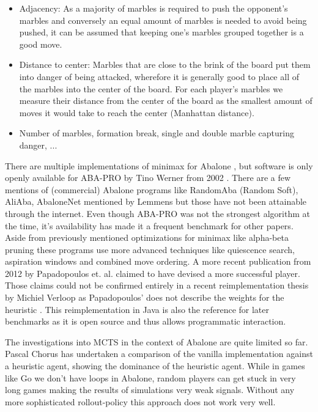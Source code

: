 \begin{itemize}
    \item Adjacency: As a majority of marbles is required to push the opponent's marbles and conversely an equal amount of marbles is needed to avoid being pushed, it can be assumed that keeping one's marbles grouped together is a good move.
    \item Distance to center: Marbles that are close to the brink of the board put them into danger of being attacked, wherefore it is generally good to place all of the marbles into the center of the board. For each player's marbles we measure their distance from the center of the board as the smallest amount of moves it would take to reach the center (Manhattan distance).
    \item Number of marbles, formation break, single and double marble capturing danger, ... \cite[p. 64]{papadopoulos_exploring_2012}
\end{itemize}

There are multiple implementations of minimax for Abalone \cite{chorus_implementing_2009,lemmens_constructing_2005,ozcan_simple_2004-1,aichholzer_algorithmic_2002}, but software is only openly available for ABA-PRO by Tino Werner from 2002 \cite{aichholzer_oswin_2006}. There are a few mentions of (commercial) Abalone programs like RandomAba (Random Soft), AliAba, AbaloneNet mentioned by Lemmens \cite[p. 7]{lemmens_constructing_2005} but those have not been attainable through the internet. Even though ABA-PRO was not the strongest algorithm at the time, it's availability has made it a frequent benchmark for other papers. Aside from previously mentioned optimizations for minimax like alpha-beta pruning these programs use more advanced techniques like quiescence search, aspiration windows and combined move ordering. A more recent publication from 2012 by Papadopoulos et. al. claimed to have devised a more successful player. \cite{papadopoulos_exploring_2012}  Those claims could not be confirmed entirely in a recent reimplementation thesis by Michiel Verloop as Papadopoulos' does not describe the weights for the heuristic \cite{verloop_critical_nodate}. This reimplementation in Java \cite{verloop_abaloneai_nodate} is also the reference for later benchmarks as it is open source \cite{verloop_abaloneai_nodate} and thus allows programmatic interaction.

The investigations into MCTS in the context of Abalone are quite limited so far. Pascal Chorus has undertaken a comparison of the vanilla implementation against a heuristic agent, showing the dominance of the heuristic agent. \cite{chorus_implementing_2009} While in games like Go we don't have loops in Abalone, random players can get stuck in very long games making the results of simulations very weak signals. Without any more sophisticated rollout-policy this approach does not work very well.

